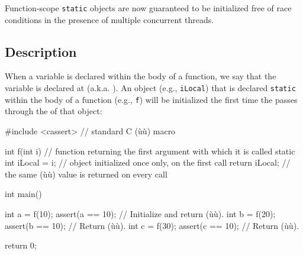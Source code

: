 

\setcounter{table}{0}
\setcounter{footnote}{0}
\setcounter{lstlisting}{0}



Function-scope \lstinline!static! objects are now guaranteed to be
initialized free of race conditions in the presence
of multiple concurrent threads.

\subsection[Description]{Description}\label{description-functionstatic}

When a variable is declared within the body of a function, we say that
the variable is declared at  (a.k.a.
). An object (e.g., \lstinline!iLocal!) that is
declared \lstinline!static! within the body of a function (e.g.,
\lstinline!f!) will be initialized the first time the  passes through the  of that object:

\begin{emcppslisting}
#include <cassert>  // standard C (ù{}ù) macro

int f(int i) // function returning the first argument with which it is called
{
    static int iLocal = i;  // object initialized once only, on the first call
    return iLocal;          // the same (ù{}ù) value is returned on every call
}

int main()
{
    int a = f(10);  assert(a == 10);  // Initialize and return (ù{}ù).
    int b = f(20);  assert(b == 10);  // Return (ù{}ù).
    int c = f(30);  assert(c == 10);  // Return (ù{}ù).

    return 0;
}
\end{emcppslisting}

